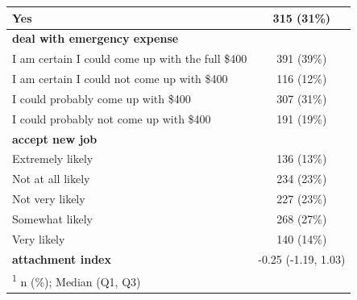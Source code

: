 \documentclass[
  11pt,
  oneside]{article}
\begin{document}
\begin{table}
\begin{tabular}[t]{l|c}
\hline
\hspace{1em}Yes & 315 (31\%)\\
\hline
\textbf{deal with emergency expense} & \\
\hline
\hspace{1em}I am certain I could come up with the full \$400 & 391 (39\%)\\
\hline
\hspace{1em}I am certain I could not come up with \$400 & 116 (12\%)\\
\hline
\hspace{1em}I could probably come up with \$400 & 307 (31\%)\\
\hline
\hspace{1em}I could probably not come up with \$400 & 191 (19\%)\\
\hline
\textbf{accept new job} & \\
\hline
\hspace{1em}Extremely likely & 136 (13\%)\\
\hline
\hspace{1em}Not at all likely & 234 (23\%)\\
\hline
\hspace{1em}Not very likely & 227 (23\%)\\
\hline
\hspace{1em}Somewhat likely & 268 (27\%)\\
\hline
\hspace{1em}Very likely & 140 (14\%)\\
\hline
\textbf{attachment index} & -0.25 (-1.19, 1.03)\\
\hline
\multicolumn{2}{l}{\rule{0pt}{1em}\textsuperscript{1} n (\%); Median (Q1, Q3)}\\
\end{tabular}
\end{table}
\end{document}

